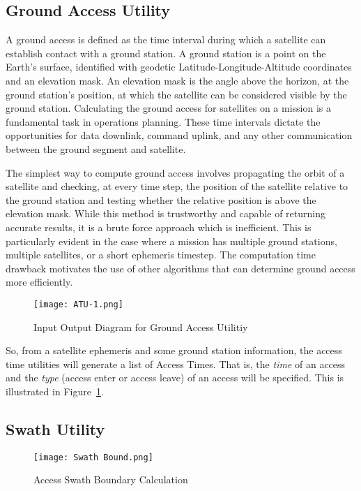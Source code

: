 \subsection{Ground Access Utility}

A ground access is defined as the time interval during which a satellite can
establish contact with a ground station. A ground station is a point on the
Earth’s surface, identified with geodetic Latitude-Longitude-Altitude
coordinates and an elevation mask. An elevation mask is the angle above the
horizon, at the ground station’s position, at which the satellite can be
considered visible by the ground station. Calculating the ground access for
satellites on a mission is a fundamental task in operations planning. These
time intervals dictate the opportunities for data downlink, command uplink, and
any other communication between the ground segment and satellite.

The simplest way to compute ground access involves propagating the orbit of a
satellite and checking, at every time step, the position of the satellite
relative to the ground station and testing whether the relative position is
above the elevation mask. While this method is trustworthy and capable of
returning accurate results, it is a brute force approach which is inefficient.
This is particularly evident in the case where a mission has multiple ground
stations, multiple satellites, or a short ephemeris timestep. The computation
time drawback motivates the use of other algorithms that can determine ground
access more efficiently.

\begin{figure}[h]
    \centering
    \texttt{[image: ATU-1.png]} 
    \caption{Input Output Diagram for Ground Access Utilitiy}
    \label{fig:atu-1} 
\end{figure}

So, from a satellite ephemeris and some ground station information, the access
time utilities will generate a list of Access Times. That is, the \textit{time}
of an access and the \textit{type} (access enter or access leave) of an access
will be specified. This is illustrated in Figure~\ref{fig:atu-1}.

\subsection {Swath Utility}

\begin{figure}
    \centering
    \texttt{[image: Swath Bound.png]} 
    \caption{Access Swath Boundary Calculation}
    \label{fig:swath-bound} 
\end{figure}

